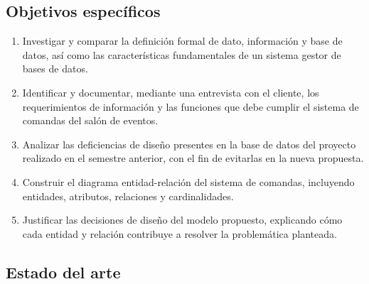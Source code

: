 \subsection{Objetivos específicos}

\begin{enumerate}[label=\arabic*.]
    \item Investigar y comparar la definición formal de dato, información y base de datos, así como las características fundamentales de un sistema gestor de bases de datos.
    \item Identificar y documentar, mediante una entrevista con el cliente, los requerimientos de información y las funciones que debe cumplir el sistema de comandas del salón de eventos.
    \item Analizar las deficiencias de diseño presentes en la base de datos del proyecto realizado en el semestre anterior, con el fin de evitarlas en la nueva propuesta.
    \item Construir el diagrama entidad-relación del sistema de comandas, incluyendo entidades, atributos, relaciones y cardinalidades.
    \item Justificar las decisiones de diseño del modelo propuesto, explicando cómo cada entidad y relación contribuye a resolver la problemática planteada.
\end{enumerate}

\clearpage

\subsection{Estado del arte}

